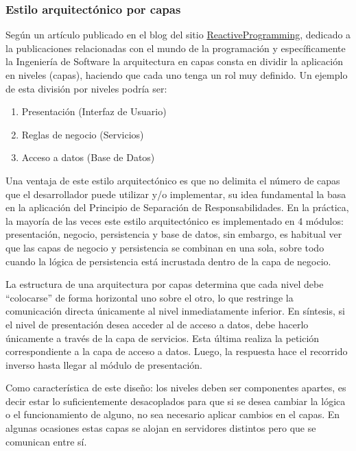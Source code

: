 \subsubsection{Estilo arquitectónico por capas}
Según un art\'iculo publicado en el blog del sitio \href{https://reactiveprogramming.io/blog/es/estilos-arquitectonicos/capas}{ReactiveProgramming},
dedicado a la publicaciones relacionadas con el mundo de la programaci\'on y espec\'ificamente la Ingenier\'ia de Software
la arquitectura en capas consta en dividir la aplicaci\'on en niveles (capas), haciendo que cada uno
tenga un rol muy definido\cite{capas}. Un ejemplo de esta divisi\'on por niveles podr\'ia ser:
\begin{enumerate}
    \item Presentaci\'on (Interfaz de Usuario)
    \item Reglas de negocio (Servicios)
    \item Acceso a datos (Base de Datos)
\end{enumerate}
Una ventaja de este estilo arquitect\'onico es que no delimita el n\'umero de 
capas que el desarrollador puede utilizar y/o implementar, su idea fundamental la basa
en la aplicaci\'on del Principio de Separaci\'on de Responsabilidades\cite{separation}. En la práctica, la mayoría de las veces 
este estilo arquitectónico es implementado en 4 m\'odulos: presentación, negocio, persistencia 
y base de datos, sin embargo, es habitual ver que las capas de negocio y persistencia se 
combinan en una sola, sobre todo cuando la lógica de persistencia está incrustada 
dentro de la capa de negocio.

La estructura de una arquitectura por capas determina que cada nivel debe ``colocarse'' de forma
horizontal uno sobre el otro, lo que restringe la comunicación directa únicamente al nivel inmediatamente inferior. 
En síntesis, si el nivel de presentación desea acceder al de acceso a datos, 
debe hacerlo únicamente a través de la capa de servicios. Esta última realiza la 
petición correspondiente a la capa de acceso a datos. Luego, la respuesta hace el 
recorrido inverso hasta llegar al m\'odulo de presentación.

Como caracter\'istica de este dise\~no: los niveles deben ser componentes apartes, 
es decir estar lo suficientemente desacoplados para que si se desea cambiar la l\'ogica o el 
funcionamiento de alguno, no sea necesario aplicar cambios en el capas. En algunas ocasiones
estas capas se alojan en servidores distintos pero que se comunican entre s\'i. 

